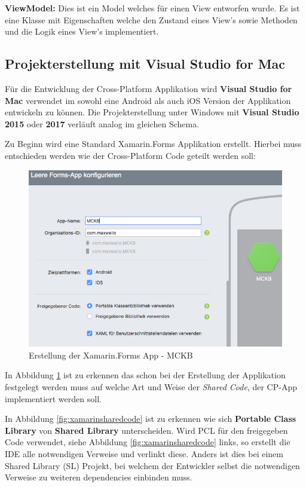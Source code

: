 	\textbf{ViewModel:} Dies ist ein Model welches für einen View entworfen wurde. Es ist eine Klasse mit Eigenschaften welche den Zustand eines View's sowie Methoden und die Logik eines View's implementiert.

\newpage
\subsection{Projekterstellung mit Visual Studio for Mac}
\label{sec:xamarincreateproject}

	Für die Entwicklung der Cross-Platform Applikation wird \textbf{Visual Studio for Mac} verwendet im sowohl eine Android als auch iOS Version der Applikation entwickeln zu können. Die Projekterstellung unter Windows mit \textbf{Visual Studio 2015} oder \textbf{2017} verläuft analog im gleichen Schema.

	Zu Beginn wird eine Standard Xamarin.Forms Applikation erstellt. Hierbei muss entschieden werden wie der Cross-Platform Code geteilt werden soll:

	\begin{figure}[h!]
		\centering
		\includegraphics[width=1\textwidth]{images/Project-Setup-one.png}
		\caption{Erstellung der Xamarin.Forms App - MCKB}
		\label{fig:xamarinprojectstart}
	\end{figure}

	In Abbildung \ref{fig:xamarinprojectstart} ist zu erkennen das schon bei der Erstellung der Applikation festgelegt werden muss auf welche Art und Weise der \textit{Shared Code}, der CP-App implementiert werden soll.

	In Abbildung \ref{fig:xamarinsharedcode} ist zu erkennen wie sich \textbf{Portable Class Library} von \textbf{Shared Library} unterscheiden. Wird PCL für den freigegeben Code verwendet, siehe Abbildung \ref{fig:xamarinsharedcode} links, so erstellt die IDE alle notwendigen Verweise und verlinkt diese. Anders ist dies bei einem Shared Library (SL) Projekt, bei welchem der Entwickler selbst die notwendigen Verweise zu weiteren dependencies einbinden muss.

